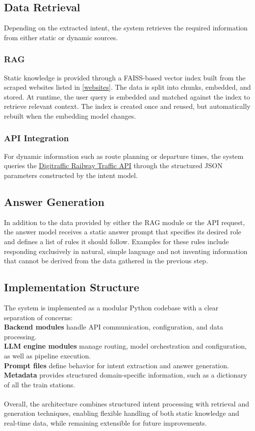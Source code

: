 \documentclass[fleqn,moreauthors,10pt]{ds_report}
\begin{document}
\subsection*{Data Retrieval}
Depending on the extracted intent, the system retrieves the required information from either static or dynamic sources.

\subsubsection*{RAG}
Static knowledge is provided through a FAISS-based vector index built from the scraped websites listed in \ref{websites}. The data is split into chunks, embedded, and stored. At runtime, the user query is embedded and matched against the index to retrieve relevant context. The index is created once and reused, but automatically rebuilt when the embedding model changes. 

\subsubsection*{API Integration}
For dynamic information such as route planning or departure times, the system queries the \href{https://www.digitraffic.fi/en/railway-traffic/}{Digitraffic Railway Traffic API} through the structured JSON parameters constructed by the intent model. 

\subsection*{Answer Generation}
In addition to the data provided by either the RAG module or the API request, the answer model receives a static answer prompt that specifies its desired role and defines a list of rules it should follow. Examples for these rules include responding exclusively in natural, simple language and not inventing information that cannot be derived from the data gathered in the previous step. 

\subsection*{Implementation Structure}
The system is implemented as a modular Python codebase with a clear separation of concerns: \\ 
\textbf{Backend modules} handle API communication, configuration, and data processing. \\
\textbf{LLM engine modules} manage routing, model orchestration and configuration, as well as pipeline execution. \\
\textbf{Prompt files} define behavior for intent extraction and answer generation. \\
\textbf{Metadata} provides structured domain-specific information, such as a dictionary of all the train stations. \\ \\
Overall, the architecture combines structured intent processing with retrieval and generation techniques, enabling flexible handling of both static knowledge and real-time data, while remaining extensible for future improvements.
\end{document}
